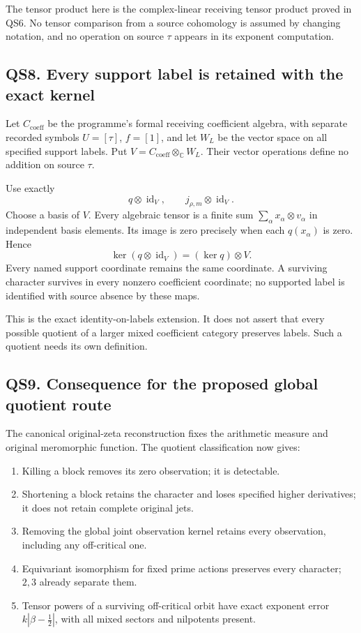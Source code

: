 The tensor product here is the complex-linear receiving tensor product
proved in QS6. No tensor comparison from a source cohomology is assumed
by changing notation, and no operation on source \(\tau\) appears in its
exponent computation.

\subsection{QS8. Every support label is retained with the exact
kernel}\label{qs8.-every-support-label-is-retained-with-the-exact-kernel}

Let \(C_{\mathrm{coeff}}\) be the programme's formal receiving
coefficient algebra, with separate recorded symbols \(U=[\tau]\),
\(f=[1]\), and let \(W_L\) be the vector space on all specified support
labels. Put \(V=C_{\mathrm{coeff}}\otimes_\mathbb C W_L\). Their vector
operations define no addition on source \(\tau\).

Use exactly \[
q\otimes\operatorname{id}_V,\qquad
j_{\rho,m}\otimes\operatorname{id}_V.
\tag{QS8.1}
\] Choose a basis of \(V\). Every algebraic tensor is a finite sum
\(\sum_\alpha x_\alpha\otimes v_\alpha\) in independent basis elements.
Its image is zero precisely when each \(q(x_\alpha)\) is zero. Hence \[
\ker(q\otimes\operatorname{id}_V)=(\ker q)\otimes V.
\tag{QS8.2}
\] Every named support coordinate remains the same coordinate. A
surviving character survives in every nonzero coefficient coordinate; no
supported label is identified with source absence by these maps.

This is the exact identity-on-labels extension. It does not assert that
every possible quotient of a larger mixed coefficient category preserves
labels. Such a quotient needs its own definition.

\subsection{QS9. Consequence for the proposed global quotient
route}\label{qs9.-consequence-for-the-proposed-global-quotient-route}

The canonical original-zeta reconstruction fixes the arithmetic measure
and original meromorphic function. The quotient classification now
gives:

\begin{enumerate}
\def\labelenumi{\arabic{enumi}.}
\tightlist
\item
  Killing a block removes its zero observation; it is detectable.
\item
  Shortening a block retains the character and loses specified higher
  derivatives; it does not retain complete original jets.
\item
  Removing the global joint observation kernel retains every
  observation, including any off-critical one.
\item
  Equivariant isomorphism for fixed prime actions preserves every
  character; \(2,3\) already separate them.
\item
  Tensor powers of a surviving off-critical orbit have exact exponent
  error \(k|\beta-\tfrac12|\), with all mixed sectors and nilpotents
  present.
\end{enumerate}

